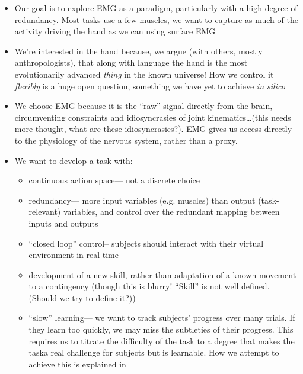 \documentclass[../main.tex]{subfiles}
\begin{document}
\begin{itemize}
  \item Our goal is to explore EMG as a paradigm, particularly with a high degree of redundancy. Most tasks use a few muscles, we want to capture as much of the activity driving the hand as we can using surface EMG
  \item We're interested in the hand because, we argue (with others, mostly anthropologists), that along with language the hand is the most evolutionarily advanced \textit{thing} in the known universe! How we control it \textit{flexibly} is a huge open question, something we have yet to achieve \textit{in silico}
  \item We choose EMG because it is the ``raw'' signal directly from the brain, circumventing constraints and idiosyncrasies of joint kinematics\ldots (this needs more thought, what are these idiosyncrasies?). EMG gives us access directly to the physiology of the nervous system, rather than a proxy.
  \item We want to develop a task with:
  \begin{itemize}
    \item continuous action space--- not a discrete choice
    \item redundancy--- more input variables (e.g. muscles) than output (task-relevant) variables, and control over the redundant mapping between inputs and outputs
    \item ``closed loop'' control-- subjects should interact with their virtual environment in real time
    \item development of a new skill, rather than adaptation of a known movement to a contingency (though this is blurry! ``Skill'' is not well defined. (Should we try to define it?))
    \item ``slow'' learning--- we want to track subjects' progress over many trials. If they learn too quickly, we may miss the subtleties of their progress. This requires us to titrate the difficulty of the task to a degree that makes the taska real challenge for subjects but is learnable. How we attempt to achieve this is explained in 

\end{itemize}
\end{itemize}
\end{document}
